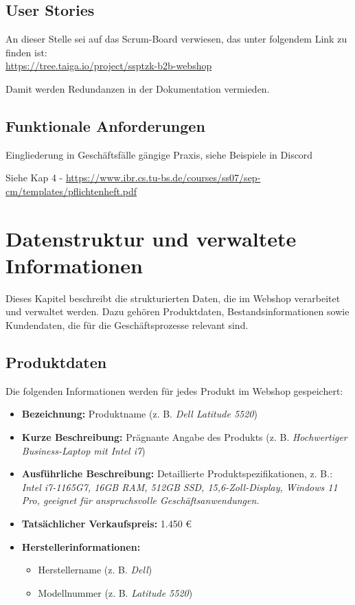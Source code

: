 \documentclass[%
	12pt,
	a4paper,
	oneside,
	parskip=full
]{scrbook}
\begin{document}
\section{User Stories}
An dieser Stelle sei auf das Scrum-Board verwiesen, das unter folgendem Link zu finden ist: \\
\url{https://tree.taiga.io/project/ssptzk-b2b-webshop}

Damit werden Redundanzen in der Dokumentation vermieden.

\section{Funktionale Anforderungen}
Eingliederung in Geschäftsfälle gängige Praxis, siehe Beispiele in Discord

Siehe Kap 4 - \url{https://www.ibr.cs.tu-bs.de/courses/ss07/sep-cm/templates/pflichtenheft.pdf}


\chapter{Datenstruktur und verwaltete Informationen}

Dieses Kapitel beschreibt die strukturierten Daten, die im Webshop verarbeitet und verwaltet werden. Dazu gehören Produktdaten, Bestandsinformationen sowie Kundendaten, die für die Geschäftsprozesse relevant sind.

\section{Produktdaten}
Die folgenden Informationen werden für jedes Produkt im Webshop gespeichert:

\begin{itemize}
	\item \textbf{Bezeichnung:} Produktname (z. B. \textit{Dell Latitude 5520})
	\item \textbf{Kurze Beschreibung:} Prägnante Angabe des Produkts (z. B. \textit{Hochwertiger Business-Laptop mit Intel i7})
	\item \textbf{Ausführliche Beschreibung:}  
	Detaillierte Produktspezifikationen, z. B.:  
	\textit{Intel i7-1165G7, 16GB RAM, 512GB SSD, 15,6-Zoll-Display, Windows 11 Pro, geeignet für anspruchsvolle Geschäftsanwendungen.}
	\item \textbf{Tatsächlicher Verkaufspreis:} 1.450 €  
	\item \textbf{Herstellerinformationen:}  
	\begin{itemize}
		\item Herstellername (z. B. \textit{Dell})  
		\item Modellnummer (z. B. \textit{Latitude 5520})  
	\end{itemize}
\end{itemize}
\end{document}
